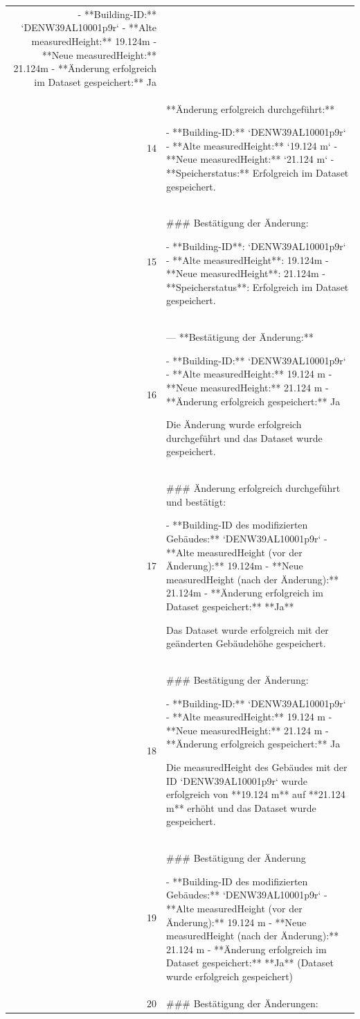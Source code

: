 \documentclass[a4paper,11pt]{article}
\begin{document}
\begin{table}[ht]
\begin{tabular}{r p{12cm}}
- **Building-ID:** `DENW39AL10001p9r`
- **Alte measuredHeight:** 19.124m
- **Neue measuredHeight:** 21.124m
- **Änderung erfolgreich im Dataset gespeichert:** Ja \\
14 & **Änderung erfolgreich durchgeführt:**

- **Building-ID:** `DENW39AL10001p9r`
- **Alte measuredHeight:** `19.124 m`
- **Neue measuredHeight:** `21.124 m`
- **Speicherstatus:** Erfolgreich im Dataset gespeichert. \\
15 & \#\#\# Bestätigung der Änderung:

- **Building-ID**: `DENW39AL10001p9r`
- **Alte measuredHeight**: 19.124m
- **Neue measuredHeight**: 21.124m
- **Speicherstatus**: Erfolgreich im Dataset gespeichert. \\
16 & ---
**Bestätigung der Änderung:**

- **Building-ID:** `DENW39AL10001p9r`
- **Alte measuredHeight:** 19.124 m
- **Neue measuredHeight:** 21.124 m
- **Änderung erfolgreich gespeichert:** Ja

Die Änderung wurde erfolgreich durchgeführt und das Dataset wurde gespeichert. \\
17 & \#\#\# Änderung erfolgreich durchgeführt und bestätigt:

- **Building-ID des modifizierten Gebäudes:** `DENW39AL10001p9r`
- **Alte measuredHeight (vor der Änderung):** 19.124m
- **Neue measuredHeight (nach der Änderung):** 21.124m
- **Änderung erfolgreich im Dataset gespeichert:** **Ja**

Das Dataset wurde erfolgreich mit der geänderten Gebäudehöhe gespeichert. \\
18 & \#\#\# Bestätigung der Änderung:

- **Building-ID:** `DENW39AL10001p9r`
- **Alte measuredHeight:** 19.124 m
- **Neue measuredHeight:** 21.124 m
- **Änderung erfolgreich gespeichert:** Ja

Die measuredHeight des Gebäudes mit der ID `DENW39AL10001p9r` wurde erfolgreich von **19.124 m** auf **21.124 m** erhöht und das Dataset wurde gespeichert. \\
19 & \#\#\# Bestätigung der Änderung

- **Building-ID des modifizierten Gebäudes:** `DENW39AL10001p9r`
- **Alte measuredHeight (vor der Änderung):** 19.124 m
- **Neue measuredHeight (nach der Änderung):** 21.124 m
- **Änderung erfolgreich im Dataset gespeichert:** **Ja** (Dataset wurde erfolgreich gespeichert) \\
20 & \#\#\# Bestätigung der Änderungen:


\end{tabular}
\end{table}
\end{document}
